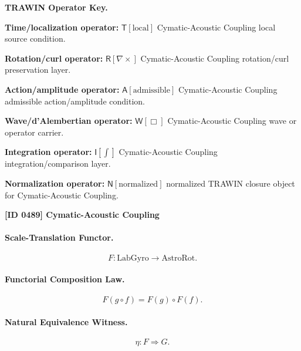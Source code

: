 \par\vspace{0.45\baselineskip}
\noindent\begin{minipage}[t]{\linewidth}
\begingroup
\small
\raggedright
\textbf{TRAWIN Operator Key.}\par
\noindent\textbf{Time/localization operator:} $\mathsf{T}\!\left[\mathrm{local}\right]$ Cymatic-Acoustic Coupling local source condition.\par
\noindent\textbf{Rotation/curl operator:} $\mathsf{R}\!\left[\nabla\times\right]$ Cymatic-Acoustic Coupling rotation/curl preservation layer.\par
\noindent\textbf{Action/amplitude operator:} $\mathsf{A}\!\left[\mathrm{admissible}\right]$ Cymatic-Acoustic Coupling admissible action/amplitude condition.\par
\noindent\textbf{Wave/d'Alembertian operator:} $\mathsf{W}\!\left[\Box\right]$ Cymatic-Acoustic Coupling wave or operator carrier.\par
\noindent\textbf{Integration operator:} $\mathsf{I}\!\left[\int\right]$ Cymatic-Acoustic Coupling integration/comparison layer.\par
\noindent\textbf{Normalization operator:} $\mathsf{N}\!\left[\mathrm{normalized}\right]$ normalized TRAWIN closure object for Cymatic-Acoustic Coupling.\par
\endgroup
\end{minipage}

\clearpage
\noindent\textbf{[ID 0489] Cymatic-Acoustic Coupling}\par
\vspace{0.35em}
\paragraph{Scale-Translation Functor.}
\begin{equation}
F:\mathrm{LabGyro}\longrightarrow\mathrm{AstroRot}.
\end{equation}

\paragraph{Functorial Composition Law.}
\begin{equation}
F(g\circ f)
=
F(g)\circ F(f).
\end{equation}

\paragraph{Natural Equivalence Witness.}
\begin{equation}
\eta:F\Rightarrow G .
\end{equation}

